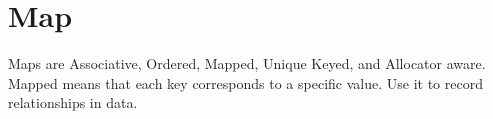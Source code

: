 \section{Map}
Maps are Associative, Ordered, Mapped, Unique Keyed, and Allocator aware\cite{cplusplus}.  Mapped means that each key corresponds to a specific value. Use it to record relationships in data.

